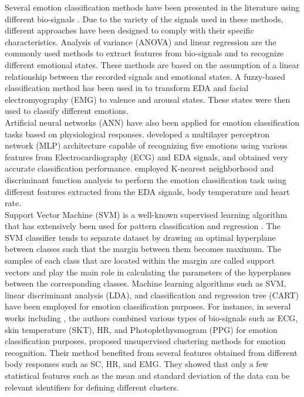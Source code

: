 Several emotion classification methods have been presented in the literature using 
different bio-signals \cite{EmotionInten2014, EmotionResp2013, ElectAct2000, HeteroKnow2016}. Due to the variety of the signals used in these methods, 
different approaches have been designed to comply with their specific characteristics. 
Analysis of variance (ANOVA) and linear regression \cite{ElectAct2000} are the 
commonly used methods to extract features from bio-signals and to recognize different 
emotional states. These methods are based on the assumption of a linear relationship 
between the recorded signals and emotional states. A fuzzy-based classification 
method \cite{EmotionInten2014} has been used in to transform EDA and facial 
electromyography (EMG) to valence and arousal states. These states were then used 
to classify different emotions. \\

Artificial neural networks (ANN) have also been applied for emotion classification 
tasks based on physiological responses. \cite{MultPercep2007} developed a multilayer perceptron 
network (MLP) architecture capable of recognizing five emotions using various features 
from Electrocardiography (ECG) and EDA signals, and obtained very accurate classification 
performance. \cite{EmotionRecog2004} employed K-nearest neighborhood and discriminant 
function analysis to perform the emotion classification task using different features 
extracted from the EDA signals, body temperature and heart rate.\\

Support Vector Machine (SVM) is a well-known supervised learning algorithm that has 
extensively been used for pattern classification and regression \cite{SupportVector1995}. The SVM classifier tends to separate dataset by drawing an optimal hyperplane 
between classes such that the margin between them becomes maximum. The samples of 
each class that are located within the margin are called support vectors and play the 
main role in calculating the parameters of the hyperplanes between the corresponding 
classes. Machine learning algorithms such as SVM, linear discriminant analysis (LDA), 
and classification and regression tree (CART) have been employed for emotion 
classification purposes. For instance, in several works including \cite{Taxonomy2011, EmotionClassifi2014}, the authors combined various types of bio-signals such as ECG, 
skin temperature (SKT), HR, and Photoplethysmogram (PPG) for  emotion classification 
purposes. \cite{FeatureSelection2006} proposed unsupervised clustering methods for emotion 
recognition. Their method benefited from several features obtained from different 
body responses such as SC, HR, and EMG. They showed that only a few statistical 
features such as the mean and standard deviation of the data can be relevant identifiers 
for defining different clusters. \\

